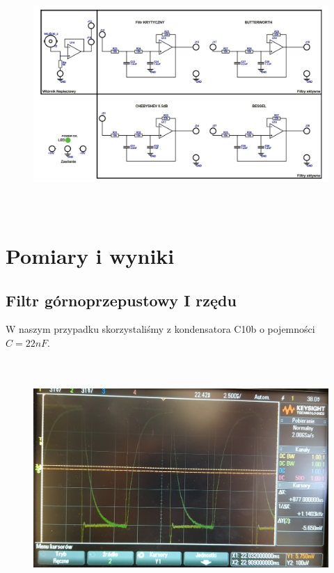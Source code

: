 \documentclass[a4paper,12pt]{article}
\begin{document}
\begin{justify}
\begin{figure}[h]
\centering
\includegraphics[width=15cm, height=9cm]{schemat_aktywne}
\end{figure}


\section{Pomiary i wyniki}

\subsection{Filtr górnoprzepustowy I rzędu}

W naszym przypadku skorzystaliśmy z kondensatora C10b o pojemności $C = 22nF$. 

\begin{figure}[h]
\centering
\includegraphics[width=15cm, height=9cm]{gorny_1}
\end{figure}


\end{justify}
\end{document}
